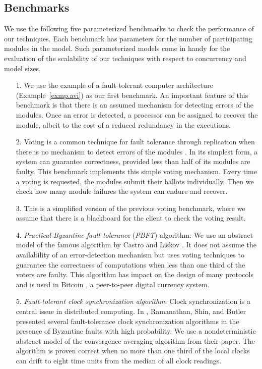 \subsection{Benchmarks}
We use the following five parameterized 
benchmarks to check the performance of our techniques. 
Each benchmark has parameters for the number of participating 
modules in the model.  
Such parameterized models come in handy for the evaluation of the scalability of our techniques with respect to concurrency and model sizes.  
\begin{itemize} 
\item[1.] We use the example of a fault-tolerant computer architecture 
  (Example~\ref{exmp.avi}) as our first benchmark.  
  An important feature of this benchmark is that there is an 
  assumed mechanism for\label{reply2.mechanism.in} detecting errors of the modules.  
  Once an error is detected, a processor can be assigned to recover the 
  module, albeit to the cost of a reduced redundancy in the executions.
\item[2.] \label{reply2.bch2} 
	Voting is a common technique for fault tolerance through 
  replication when there is no mechanism to detect errors of the 
  modules \cite{Pradhan96}.  
  In its simplest form, a system can guarantee correctness, provided less than half of its modules are faulty.   
  This benchmark implements this simple voting mechanism.  
  Every time a voting is requested, the modules submit their ballots individually.  
  Then we check how many module failures the system can endure and recover. 
\item[3.] This is a simplified version of the previous voting benchmark, where we assume that there is a blackboard 
  for the client to check the voting result.  
\item[4.] {\em Practical Byzantine fault-tolerance} ({\em PBFT}) algorithm: 
  We use an abstract model of the famous algorithm by 
  Castro and Liskov \cite{CL99}. 
  It does not assume the availability of an error-detection 
  mechanism but uses 
  voting techniques to guarantee the correctness of 
  computations when less than one third of the voters are faulty.  
  This algorithm has impact on the design of many protocols 
  \cite{AGGRW05,CMLRS06,KADCW09,GKVQ10,CWADM09} and is used in 
  Bitcoin \cite{bitcoin}, a peer-to-peer digital currency system.  
\item[5.] {\em Fault-tolerant clock synchronization algorithm}: 
  Clock synchronization is a central issue in distributed computing. 
  In \cite{RSB90}, 
  Ramanathan, Shin, and Butler presented 
  several fault-tolerance clock synchronization algorithms 
  in the presence of Byzantine faults with high probability.  
  We use a nondeterministic abstract model of the convergence averaging 
  algorithm from their paper.  
  The algorithm is proven correct when no more than one third of the 
  local clocks can drift to eight time units from the median of all clock 
  readings.  
\end{itemize}
